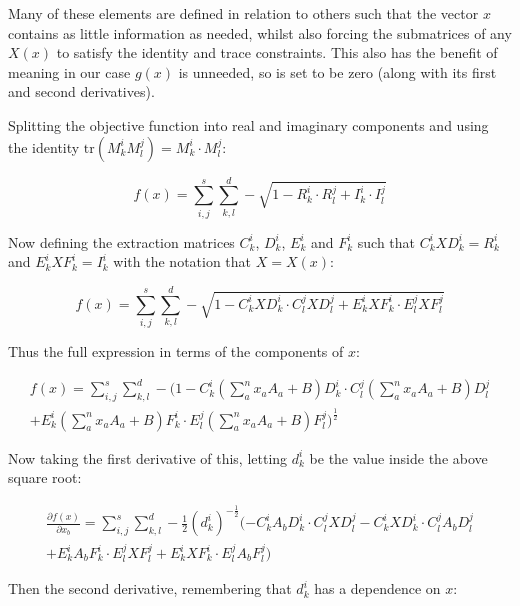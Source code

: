 \documentclass{article}
\begin{document}
Many of these elements are defined in relation to others such that the vector $x$ contains as little information as needed, whilst also forcing the submatrices of any $X(x)$ to satisfy the identity and trace constraints. This also has the benefit of meaning in our case $g(x)$ is unneeded, so is set to be zero (along with its first and second derivatives).

Splitting the objective function into real and imaginary components and using the identity $\text{tr}(M_k^i M_l^j) = M_k^i \cdot M_l^j$:

\begin{equation}
	f(x) = \sum_{i,j}^s \sum_{k,l}^d -\sqrt{1 - R_k^i \cdot R_l^j + I_k^i \cdot I_l^j} 
\end{equation}

Now defining the extraction matrices $C_k^i$, $D_k^i$, $E_k^i$ and $F_k^i$ such that $C_k^i X D_k^i = R_k^i$ and $E_k^i X F_k^i = I_k^i$ with the notation that $X = X(x)$:

\begin{equation}
	f(x) = \sum_{i,j}^s \sum_{k,l}^d -\sqrt{1 - C_k^i X D_k^i \cdot C_l^j X D_l^j + E_k^i X F_k^i \cdot E_l^j X F_l^j} 
\end{equation}

Thus the full expression in terms of the components of $x$: 

\begin{align}
	f(x) = \sum_{i,j}^s \sum_{k,l}^d -\bigg(1 - C_k^i (\sum_a^n x_a A_a + B) D_k^i \cdot C_l^j (\sum_a^n x_a A_a + B) D_l^j \\
	+ E_k^i (\sum_a^n x_a A_a + B) F_k^i \cdot E_l^j (\sum_a^n x_a A_a + B) F_l^j\bigg)^{\frac{1}{2}} 
\end{align}

Now taking the first derivative of this, letting $d_k^i$ be the value inside the above square root:

\begin{align}
	\frac{\partial f(x)}{\partial x_b} = \sum_{i,j}^s \sum_{k,l}^d -\frac{1}{2}(d_k^i)^{-\frac{1}{2}}(-C_k^i A_b D_k^i \cdot C_l^j X D_l^j - C_k^i X D_k^i \cdot C_l^j A_b D_l^j \\
	+ E_k^i A_b F_k^i \cdot E_l^j X F_l^j + E_k^i X F_k^i \cdot E_l^j A_b F_l^j) 
\end{align}

Then the second derivative, remembering that $d_k^i$ has a dependence on $x$:
\end{document}

